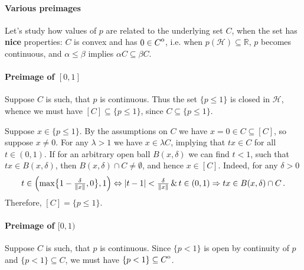 \documentclass[a4paper]{article}
\newcommand{\Hcal}{\mathcal{H}}
\newcommand{\real}{\mathbb{R}}
\newcommand{\interior}[1]{%
  {\kern0pt#1}^{\mathrm{o}}%
}
\begin{document}

\paragraph{Various preimages} %
\label{par:various_preimages}

Let's study how values of $p$ are related to the underlying set $C$, when the set
has {\bf nice} properties: $C$ is convex and has $0\in \interior{C}$, i.e. when
$p(\Hcal) \subseteq \real$, $p$ becomes continuous, and $\alpha \leq \beta$ implies
$\alpha C \subseteq \beta C$. %


\paragraph{Preimage of $[0, 1]$} %
\label{par:preimage_of_0_1_closed}

Suppose $C$ is such, that $p$ is continuous. Thus the set $\{p\leq 1\}$ is closed in
$\Hcal$, whence we must have $[C] \subseteq \{p\leq 1\}$, since $C \subseteq \{p\leq 1\}$.

Suppose $x\in \{p\leq 1\}$. By the assumptions on $C$ we have $x = 0 \in C \subseteq [C]$,
so suppose $x\neq 0$. For any $\lambda > 1$ we have $x\in \lambda C$, implying that
$t x \in C$ for all $t \in (0, 1)$. If for an arbitrary open ball $B(x, \delta)$ we
can find $t < 1$, such that $t x \in B(x, \delta)$, then $B(x, \delta) \cap C \neq
\emptyset$, and hence $x \in [C]$. Indeed, for any $\delta > 0$
\begin{equation*}
  t \in\Bigl(
    \max\bigl\{1 - \tfrac\delta{\|x\|}, 0\bigr\}, 1
  \Bigr)
    \Leftrightarrow
      \lvert t - 1\rvert < \tfrac\delta{\|x\|}
      \, \& \, t \in (0, 1)
    \Rightarrow
      t x \in B(x, \delta) \cap C
      \,.
\end{equation*}
Therefore, $[C] = \{p \leq 1\}$.


\paragraph{Preimage of $[0, 1)$} %
\label{par:preimage_of_0_1_open}

Suppose $C$ is such, that $p$ is continuous. Since $\{p < 1\}$ is open by continuity
of $p$ and $\{p < 1\} \subseteq C$, we must have $\{p < 1\} \subseteq \interior{C}$.
\end{document}
